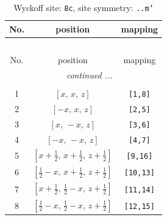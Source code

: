 \documentclass[fleqn,8pt]{jsarticle}
\begin{document}
\renewcommand{\arraystretch}{1.2}
\begin{longtable}{ccc}
\caption{Wyckoff site: {\tt 8c}, site symmetry: {\tt ..m'}}
 \\
 \hline \hline
No. & position & mapping \\ \hline \endfirsthead

\multicolumn{2}{l}{\tablename\ \thetable{}} \\
 \hline \hline
No. & position & mapping \\ \hline \endhead

 \hline \hline
\multicolumn{2}{r}{\footnotesize\it continued ...} \\ \endfoot

 \hline \hline
\multicolumn{2}{r}{} \\ \endlastfoot

1 & $\left[ x,\, x,\, z \right]$ & {\tt [1,8]} \\ \hline
2 & $\left[ - x,\, x,\, z \right]$ & {\tt [2,5]} \\ \hline
3 & $\left[ x,\, - x,\, z \right]$ & {\tt [3,6]} \\ \hline
4 & $\left[ - x,\, - x,\, z \right]$ & {\tt [4,7]} \\ \hline
5 & $\left[ x + \frac{1}{2},\, x + \frac{1}{2},\, z + \frac{1}{2} \right]$ & {\tt [9,16]} \\ \hline
6 & $\left[ \frac{1}{2} - x,\, x + \frac{1}{2},\, z + \frac{1}{2} \right]$ & {\tt [10,13]} \\ \hline
7 & $\left[ x + \frac{1}{2},\, \frac{1}{2} - x,\, z + \frac{1}{2} \right]$ & {\tt [11,14]} \\ \hline
8 & $\left[ \frac{1}{2} - x,\, \frac{1}{2} - x,\, z + \frac{1}{2} \right]$ & {\tt [12,15]} \\
\end{longtable}
\renewcommand{\arraystretch}{1.2}
\end{document}
